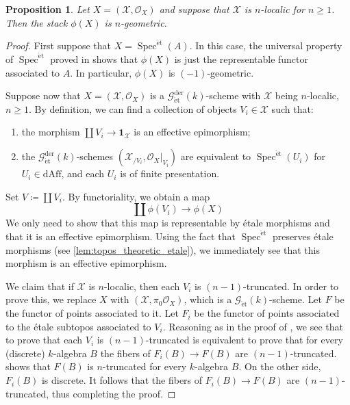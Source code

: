 \documentclass[12pt,a4paper,reqno]{amsart}
\theoremstyle{plain}
\newtheorem{prop}[thm]{Proposition}
\theoremstyle{definition}
\theoremstyle{remark}
\numberwithin{equation}{section}
\begin{document}
\begin{prop} \label{prop:phi_X_geometric}
	Let $X = ({\mathcal X}, {\mathcal O}_X)$ and suppose that ${\mathcal X}$ is $n$-localic for $n \ge 1$.
	Then the stack $\phi(X)$ is $n$-geometric.
\end{prop}

\begin{proof}
	First suppose that $X = \operatorname{Spec}^{\mathrm{\acute{e}t}}(A)$.
	In this case, the universal property of $\operatorname{Spec}^{\mathrm{\acute{e}t}}$ proved in \cite[Â§2.2]{DAG-V} shows that $\phi(X)$ is just the representable functor associated to $A$.
	In particular, $\phi(X)$ is $(-1)$-geometric.
	
	Suppose now that $X = ({\mathcal X}, {\mathcal O}_X)$ is a ${{\mathcal G}_{\mathrm{\acute{e}t}}^\mathrm{der}(k)}$-scheme with ${\mathcal X}$ being $n$-localic, $n \ge 1$.
	By definition, we can find a collection of objects $V_i \in {\mathcal X}$ such that:
	\begin{enumerate}
		\item the morphism $\coprod V_i \to \mathbf 1_{\mathcal X}$ is an effective epimorphism;
		\item the ${{\mathcal G}_{\mathrm{\acute{e}t}}^\mathrm{der}(k)}$-schemes $({\mathcal X}_{/V_i}, {\mathcal O}_X |_{V_i})$ are equivalent to $\operatorname{Spec}^{\mathrm{\acute{e}t}}(U_i)$ for $U_i \in \mathrm{dAff}$, and each $U_i$ is of finite presentation.
	\end{enumerate}
	Set $V \coloneqq \coprod V_i$.
	By functoriality, we obtain a map
	\[ \coprod \phi(V_i) \to \phi(X) \]
	We only need to show that this map is representable by \'etale morphisms and that it is an effective epimorphism.
	Using the fact that $\operatorname{Spec}^{\mathrm{\acute{e}t}}$ preserves \'etale morphisms (see \cref{lem:topos_theoretic_etale}), we immediately see that this morphism is an effective epimorphism.
	
	We claim that if ${\mathcal X}$ is $n$-localic, then each $V_i$ is $(n-1)$-truncated.
	In order to prove this, we replace $X$ with $({\mathcal X}, \pi_0 {\mathcal O}_X)$, which is a ${{\mathcal G}_{\mathrm{\acute{e}t}}(k)}$-scheme.
	Let $F$ be the functor of points associated to it.
	Let $F_i$ be the functor of points associated to the \'etale subtopos associated to $V_i$.
	Reasoning as in the proof of \cite[Theorem 2.6.18]{DAG-V}, we see that to prove that each $V_i$ is $(n-1)$-truncated is equivalent to prove that for every (discrete) $k$-algebra $B$ the fibers of $F_i(B) \to F(B)$ are $(n-1)$-truncated.
	\cite[Lemma 2.6.19]{DAG-V} shows that $F(B)$ is $n$-truncated for every $k$-algebra $B$.
	On the other side, $F_i(B)$ is discrete.
	It follows that the fibers of $F_i(B) \to F(B)$ are $(n-1)$-truncated, thus completing the proof.
	

\end{proof}
\end{document}
